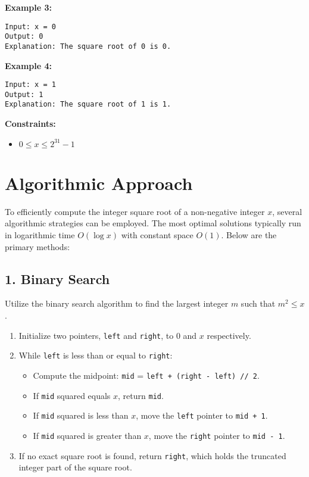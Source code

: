 \textbf{Example 3:}

\begin{verbatim}
Input: x = 0
Output: 0
Explanation: The square root of 0 is 0.
\end{verbatim}

\textbf{Example 4:}

\begin{verbatim}
Input: x = 1
Output: 1
Explanation: The square root of 1 is 1.
\end{verbatim}

\textbf{Constraints:}

\begin{itemize}
    \item \(0 \leq x \leq 2^{31} - 1\)
\end{itemize}

\section*{Algorithmic Approach}

To efficiently compute the integer square root of a non-negative integer \(x\), several algorithmic strategies can be employed. The most optimal solutions typically run in logarithmic time \(O(\log x)\) with constant space \(O(1)\). Below are the primary methods:

\subsection*{1. Binary Search}

Utilize the binary search algorithm to find the largest integer \(m\) such that \(m^2 \leq x\).

\begin{enumerate}
    \item Initialize two pointers, \texttt{left} and \texttt{right}, to \(0\) and \(x\) respectively.
    \item While \texttt{left} is less than or equal to \texttt{right}:
    \begin{itemize}
        \item Compute the midpoint: \texttt{mid} = \texttt{left + (right - left) // 2}.
        \item If \texttt{mid} squared equals \(x\), return \texttt{mid}.
        \item If \texttt{mid} squared is less than \(x\), move the \texttt{left} pointer to \texttt{mid + 1}.
        \item If \texttt{mid} squared is greater than \(x\), move the \texttt{right} pointer to \texttt{mid - 1}.
    \end{itemize}
    \item If no exact square root is found, return \texttt{right}, which holds the truncated integer part of the square root.
\end{enumerate}

